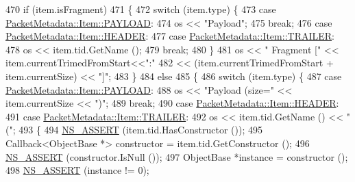 \begin{DoxyCode}
470       \textcolor{keywordflow}{if} (item.isFragment)
471         \{
472           \textcolor{keywordflow}{switch} (item.type) \{
473             \textcolor{keywordflow}{case} \hyperlink{structns3_1_1PacketMetadata_1_1Item_ab0a06781a8793079afeab58a9a9b3174ac2bc28ee0adb79d428d3f5a11be52f80}{PacketMetadata::Item::PAYLOAD}:
474               os << \textcolor{stringliteral}{"Payload"};
475               \textcolor{keywordflow}{break};
476             \textcolor{keywordflow}{case} \hyperlink{structns3_1_1PacketMetadata_1_1Item_ab0a06781a8793079afeab58a9a9b3174a35a76b7dc57ca42587ecfb5f81f1bcb2}{PacketMetadata::Item::HEADER}:
477             \textcolor{keywordflow}{case} \hyperlink{structns3_1_1PacketMetadata_1_1Item_ab0a06781a8793079afeab58a9a9b3174ab32282a2f84adad5e57549c03179ff45}{PacketMetadata::Item::TRAILER}:
478               os << item.tid.GetName ();
479               \textcolor{keywordflow}{break};
480             \}
481           os << \textcolor{stringliteral}{" Fragment ["} << item.currentTrimedFromStart<<\textcolor{stringliteral}{":"}
482              << (item.currentTrimedFromStart + item.currentSize) << \textcolor{stringliteral}{"]"};
483         \}
484       \textcolor{keywordflow}{else}
485         \{
486           \textcolor{keywordflow}{switch} (item.type) \{
487             \textcolor{keywordflow}{case} \hyperlink{structns3_1_1PacketMetadata_1_1Item_ab0a06781a8793079afeab58a9a9b3174ac2bc28ee0adb79d428d3f5a11be52f80}{PacketMetadata::Item::PAYLOAD}:
488               os << \textcolor{stringliteral}{"Payload (size="} << item.currentSize << \textcolor{stringliteral}{")"};
489               \textcolor{keywordflow}{break};
490             \textcolor{keywordflow}{case} \hyperlink{structns3_1_1PacketMetadata_1_1Item_ab0a06781a8793079afeab58a9a9b3174a35a76b7dc57ca42587ecfb5f81f1bcb2}{PacketMetadata::Item::HEADER}:
491             \textcolor{keywordflow}{case} \hyperlink{structns3_1_1PacketMetadata_1_1Item_ab0a06781a8793079afeab58a9a9b3174ab32282a2f84adad5e57549c03179ff45}{PacketMetadata::Item::TRAILER}:
492               os << item.tid.GetName () << \textcolor{stringliteral}{"("};
493               \{
494                 \hyperlink{assert_8h_a6dccdb0de9b252f60088ce281c49d052}{NS\_ASSERT} (item.tid.HasConstructor ());
495                 Callback<ObjectBase *> constructor = item.tid.GetConstructor ();
496                 \hyperlink{assert_8h_a6dccdb0de9b252f60088ce281c49d052}{NS\_ASSERT} (constructor.IsNull ());
497                 ObjectBase *instance = constructor ();
498                 \hyperlink{assert_8h_a6dccdb0de9b252f60088ce281c49d052}{NS\_ASSERT} (instance != 0);

\end{DoxyCode}
